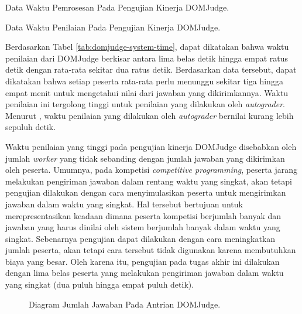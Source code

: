 \begin{table}[ht]
    \centering
    
    \caption{Data Waktu Pemrosesan Pada Pengujian Kinerja DOMJudge.}
    \label{tab:domjudge-process-time}
\end{table}

\begin{table}[ht]
    \centering
    
    \caption{Data Waktu Penilaian Pada Pengujian Kinerja DOMJudge.}
    \label{tab:domjudge-system-time}
\end{table}

\par Berdasarkan Tabel \ref{tab:domjudge-system-time}, dapat dikatakan bahwa waktu penilaian dari DOMJudge berkisar antara lima belas detik hingga empat ratus detik dengan rata-rata sekitar dua ratus detik. Berdasarkan data tersebut, dapat dikatakan bahwa setiap peserta rata-rata perlu menunggu sekitar tiga hingga empat menit untuk mengetahui nilai dari jawaban yang dikirimkannya. Waktu penilaian ini tergolong tinggi untuk penilaian yang dilakukan oleh \textit{autograder}. Menurut \cite{danutamalms}, waktu penilaian yang dilakukan oleh \textit{autograder} bernilai kurang lebih sepuluh detik. 

\par Waktu penilaian yang tinggi pada pengujian kinerja DOMJudge disebabkan oleh jumlah \textit{worker} yang tidak sebanding dengan jumlah jawaban yang dikirimkan oleh peserta. Umumnya, pada kompetisi \textit{competitive programming}, peserta jarang melakukan pengiriman jawaban dalam rentang waktu yang singkat, akan tetapi pengujian dilakukan dengan cara menyimulasikan peserta untuk mengirimkan jawaban dalam waktu yang singkat. Hal tersebut bertujuan untuk merepresentasikan keadaan dimana peserta kompetisi berjumlah banyak dan jawaban yang harus dinilai oleh sistem berjumlah banyak dalam waktu yang singkat. Sebenarnya pengujian dapat dilakukan dengan cara meningkatkan jumlah peserta, akan tetapi cara tersebut tidak digunakan karena membutuhkan biaya yang besar. Oleh karena itu, pengujian pada tugas akhir ini dilakukan dengan lima belas peserta yang melakukan pengiriman jawaban dalam waktu yang singkat (dua puluh hingga empat puluh detik).

\begin{figure}[ht!]
    \centering
    
    \caption{Diagram Jumlah Jawaban Pada Antrian DOMJudge.}
    \label{fig:domjudge-queue}
\end{figure}

